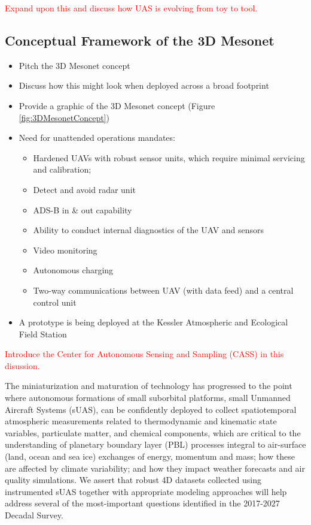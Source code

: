 \documentclass[sensors,review,submit,moreauthors,pdftex,10pt,a4paper]{mdpi}
\theoremstyle{mdpi}
\newcounter{ex}
\newcounter{re}
\theoremstyle{mdpidefinition}
\begin{document}
\textcolor{red}{Expand upon this and discuss how UAS is evolving from toy to tool.}

\subsection{Conceptual Framework of the 3D Mesonet}
\begin{itemize}[leftmargin=*,labelsep=4mm]
\color{blue}
\item	Pitch the 3D Mesonet concept
\item	Discuss how this might look when deployed across a broad footprint
\item	Provide a graphic of the 3D Mesonet concept (Figure \ref{fig:3DMesonetConcept})
\item	Need for unattended operations mandates:
\begin{itemize}[leftmargin=*,labelsep=4mm]
\item	Hardened UAVs with robust sensor units, which require minimal servicing and calibration;
\item	Detect and avoid radar unit
\item	ADS-B in \& out capability
\item	Ability to conduct internal diagnostics of the UAV and sensors
\item	Video monitoring
\item	Autonomous charging
\item	Two-way communications between UAV (with data feed) and a central control unit
\end{itemize}
\item	A prototype is being deployed at the Kessler Atmospheric and Ecological Field Station
\end{itemize}

\textcolor{red}{Introduce the Center for Autonomous Sensing and Sampling (CASS) in this disussion.}

The miniaturization and maturation of technology has progressed to the point where autonomous formations of small suborbital platforms, small Unmanned Aircraft Systems (sUAS), can be confidently deployed to collect spatiotemporal atmospheric measurements related to thermodynamic and kinematic state variables, particulate matter, and chemical components, which are critical to the understanding of planetary boundary layer (PBL) processes integral to air-surface (land, ocean and sea ice) exchanges of energy, momentum and mass; how these are affected by climate variability; and how they impact weather forecasts and air quality simulations. We assert that robust 4D datasets collected using instrumented sUAS together with appropriate modeling approaches will help address several of the most-important questions identified in the 2017-2027 Decadal Survey.
\end{document}
